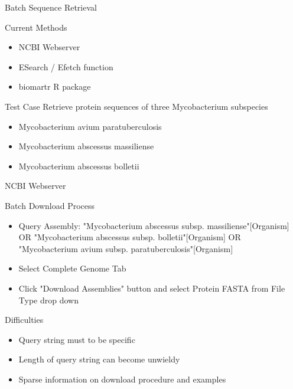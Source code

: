 \documentclass[11pt]{beamer}
\begin{document}
	\begin{frame}{Batch Sequence Retrieval}
	\begin{block}{Current Methods}
	\begin{itemize}
	\item NCBI Webserver
	\item ESearch / Efetch function
	\item biomartr R package
	\end{itemize}
	\end{block}
	
	\begin{block}{Test Case}
	Retrieve protein sequences of three Mycobacterium subspecies \\ 
	\begin{itemize}
	\item Mycobacterium avium paratuberculosis
	\item Mycobacterium abscessus massiliense
	\item Mycobacterium abscessus bolletii
	\end{itemize}
	\end{block}
	
	\end{frame}
	
	
	\begin{frame}{NCBI Webserver}
	\begin{block}{Batch Download Process}
	\begin{itemize}
	\item Query Assembly: "Mycobacterium abscessus \alert{subsp.} massiliense"[Organism] OR "Mycobacterium abscessus \alert{subsp.} bolletii"[Organism] OR "Mycobacterium avium \alert{subsp.} paratuberculosis"[Organism] 
	\item Select Complete Genome Tab
	\item Click "Download Assemblies" button and select Protein FASTA from File Type drop down 
	\end{itemize}
	\end{block}
	\begin{block}{Difficulties}
	\begin{itemize}
	\item Query string must to be specific
	\item Length of query string can become unwieldy
	\item Sparse information on download procedure and examples
	\end{itemize}
	\end{block}
	\end{frame}
	
\end{document}
